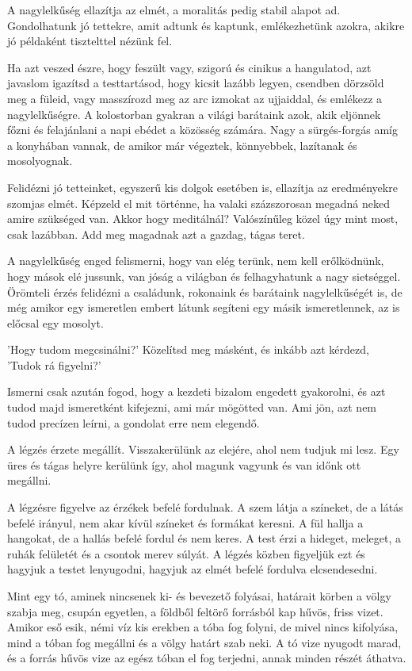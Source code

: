 A nagylelkűség ellazítja az elmét, a moralitás pedig stabil alapot ad.
Gondolhatunk jó tettekre, amit adtunk és kaptunk, emlékezhetünk azokra,
akikre jó példaként tisztelttel nézünk fel.

Ha azt veszed észre, hogy feszült vagy, szigorú és cinikus a hangulatod,
azt javaslom igazítsd a testtartásod, hogy kicsit lazább legyen,
csendben dörzsöld meg a füleid, vagy masszírozd meg az arc izmokat az
ujjaiddal, és emlékezz a nagylelkűségre. A kolostorban gyakran a világi
barátaink azok, akik eljönnek főzni és felajánlani a napi ebédet a
közösség számára. Nagy a sürgés-forgás amíg a konyhában vannak, de
amikor már végeztek, könnyebbek, lazítanak és mosolyognak.

Felidézni jó tetteinket, egyszerű kis dolgok esetében is, ellazítja az
eredményekre szomjas elmét. Képzeld el mit történne, ha valaki
százszorosan megadná neked amire szükséged van. Akkor hogy meditálnál?
Valószínűleg közel úgy mint most, csak lazábban. Add meg magadnak azt a
gazdag, tágas teret.

A nagylelkűség enged felismerni, hogy van elég terünk, nem kell
erőlködnünk, hogy mások elé jussunk, van jóság a világban és
felhagyhatunk a nagy sietséggel. Örömteli érzés felidézni a családunk,
rokonaink és barátaink nagylelkűségét is, de még amikor egy ismeretlen
embert látunk segíteni egy másik ismeretlennek, az is előcsal egy
mosolyt.

'Hogy tudom megcsinálni?' Közelítsd meg másként, és inkább azt kérdezd,
'Tudok rá figyelni?'

Ismerni csak azután fogod, hogy a kezdeti bizalom engedett gyakorolni,
és azt tudod majd ismeretként kifejezni, ami már mögötted van. Ami jön,
azt nem tudod precízen leírni, a gondolat erre nem elegendő.

A légzés érzete megállít. Visszakerülünk az elejére, ahol nem tudjuk mi
lesz. Egy üres és tágas helyre kerülünk így, ahol magunk vagyunk és van
időnk ott megállni.

A légzésre figyelve az érzékek befelé fordulnak. A szem látja a
színeket, de a látás befelé irányul, nem akar kívül színeket és formákat
keresni. A fül hallja a hangokat, de a hallás befelé fordul és nem
keres. A test érzi a hideget, meleget, a ruhák felületét és a csontok
merev súlyát. A légzés közben figyeljük ezt és hagyjuk a testet
lenyugodni, hagyjuk az elmét befelé fordulva elcsendesedni.

Mint egy tó, aminek nincsenek ki- és bevezető folyásai, határait körben
a völgy szabja meg, csupán egyetlen, a földből feltörő forrásból kap
hűvös, friss vizet. Amikor eső esik, némi víz kis erekben a tóba fog
folyni, de mivel nincs kifolyása, mind a tóban fog megállni és a völgy
határt szab neki. A tó vize nyugodt marad, és a forrás hűvös vize az
egész tóban el fog terjedni, annak minden részét áthatva.

